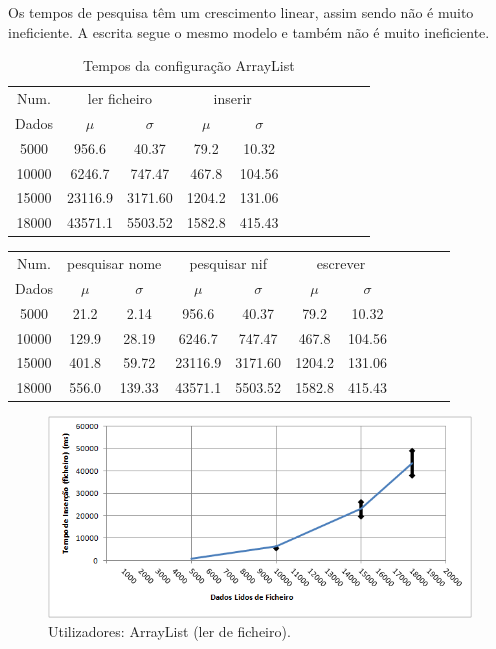 \documentclass[a5paper,twocolumn, 11pt]{article}
\begin{document}
Os tempos de pesquisa têm um crescimento linear, assim sendo não é muito ineficiente. A escrita segue o mesmo modelo e também não é muito ineficiente.
\clearpage
\onecolumn
\begin{center}
    \begin{table}[h!b!t!]
    \begin{center}
    \caption{Tempos da configuração ArrayList}
    \begin{tabular}[hbt]{ | *{11}{c|} }
    \hline
        Num. & \multicolumn{2}{|c|}{ler ficheiro} & \multicolumn{2}{|c|}{inserir}\\ %
        Dados & $\mu$ & $\sigma$ & $\mu$ & $\sigma$\\ \hline
        5000 & 956.6 & 40.37 & 79.2 & 10.32\\ \hline
        10000 & 6246.7 & 747.47 & 467.8 & 104.56\\ \hline
        15000 & 23116.9 & 3171.60 & 1204.2 & 131.06\\ \hline
        18000 & 43571.1 & 5503.52 & 1582.8 & 415.43\\ \hline
    \end{tabular}
\end{center}
\end{table}
    \begin{tabular}{ | *{11}{c|} }
    \hline
        Num.  & \multicolumn{2}{|c|}{pesquisar nome} & \multicolumn{2}{|c|}{pesquisar nif} & \multicolumn{2}{|c|}{escrever}\\ %
        Dados & $\mu$ & $\sigma$ & $\mu$ & $\sigma$ & $\mu$ & $\sigma$\\ \hline
        5000 & 21.2 & 2.14 & 956.6 & 40.37 & 79.2 & 10.32\\ \hline
        10000 & 129.9 & 28.19 & 6246.7 & 747.47 & 467.8 & 104.56\\ \hline
        15000 & 401.8 & 59.72 & 23116.9 & 3171.60 & 1204.2 & 131.06\\ \hline
        18000 & 556.0 & 139.33 & 43571.1 & 5503.52 & 1582.8 & 415.43\\ \hline
    \end{tabular}
\end{center}
\begin{figure}[h!b!t!]
    \caption[Utilizadores: ArrayList (ler de ficheiro)]{Utilizadores: ArrayList (ler de ficheiro).}
    \label{hashtable}
    \centering
        \includegraphics[width=400pt]{user_c1_o1.png}
\end{figure}
\end{document}
